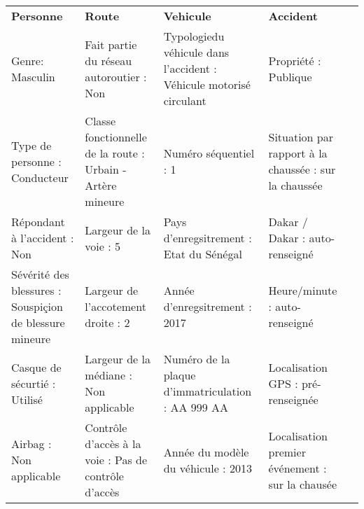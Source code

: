\documentclass[a4paper,12pt,twoside,french]{book}
[a4paper,12pt,twoside]
\begin{document}
\begin{landscape}
\begin{table}[]
\centering
\begin{adjustbox}{width=2.1\textwidth,center=\textwidth}
\begin{tabular}{|l|l|l|l|l}
\hline

\textbf{Personne}                                                                            & \textbf{Route}                                             & \textbf{Vehicule}                                                                   & \textbf{Accident}                                     &  \\
Genre: Masculin                                                                              & Fait partie du réseau autoroutier : Non                    & Typologiedu véhicule dans l'accident : Véhicule motorisé circulant                  & Propriété : Publique                                  &  \\
Type de personne : Conducteur                                                                & Classe fonctionnelle de la route : Urbain - Artère mineure & Numéro séquentiel : 1                                                               & Situation par rapport à la chaussée : sur la chaussée &  \\
Répondant à l'accident : Non                                                                 & Largeur de la voie : 5                                     & Pays d'enregsitrement : Etat du Sénégal                                             & Dakar / Dakar : auto-renseigné                        &  \\
Sévérité des blessures : Souspiçion de   blessure mineure                                    & Largeur de l'accotement droite : 2                         & Année d'enregsitrement : 2017                                                       & Heure/minute : auto-renseigné                         &  \\
Casque de sécurtié : Utilisé                                                                 & Largeur de la médiane : Non applicable                     & Numéro de la plaque d'immatriculation : AA 999 AA                                   & Localisation GPS : pré-renseignée                     &  \\
Airbag : Non applicable                                                                      & Contrôle d'accès à la voie : Pas de contrôle d'accès       & Année du modèle du véhicule : 2013                                                  & Localisation premier événement : sur la chausée       &  \\

\end{tabular}
\end{adjustbox}
\end{table}
\end{landscape}
\end{document}
